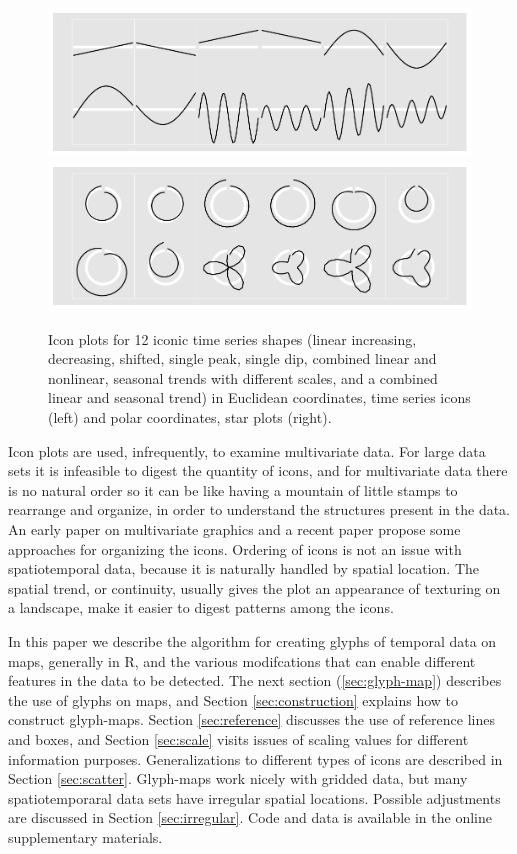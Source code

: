 \documentclass[oneside]{article}
\begin{document}
\begin{figure}[htbp]
  \centering
  \includegraphics[width=0.5\linewidth]{euclid-to-polar-1}%
  \includegraphics[width=0.5\linewidth]{euclid-to-polar-2}

  \caption{Icon plots for 12 iconic time series shapes (linear increasing, decreasing, shifted, single peak, single dip, combined linear and nonlinear, seasonal trends with different scales, and a combined linear and seasonal trend) in Euclidean coordinates, time series icons (left) and polar coordinates, star plots (right).}
  \label{fig:templates}
\end{figure}



Icon plots are used, infrequently, to examine multivariate data. For large data sets it is infeasible to digest the quantity of icons, and for multivariate data there is no natural order so it can be like having a mountain of little stamps to rearrange and organize, in order to understand the structures present in the data. An early paper on multivariate graphics \citep{kleiner:1981} and a recent paper \citep{hurley:2010} propose some approaches for organizing the icons. Ordering of icons is not an issue with spatiotemporal data, because it is naturally handled by spatial location. The spatial trend, or continuity, usually gives the plot an appearance of texturing on a landscape, make it easier to digest patterns among the icons.

In this paper we describe the algorithm for creating glyphs of temporal data on maps, generally in R, and the various modifcations that can enable different features in the data to be detected. The next section (\ref{sec:glyph-map}) describes the use of glyphs on maps, and Section \ref{sec:construction} explains how to construct glyph-maps. Section \ref{sec:reference} discusses the use of reference lines and boxes, and Section \ref{sec:scale} visits issues of scaling values for different information purposes. Generalizations to different types of icons are described in Section \ref{sec:scatter}. Glyph-maps work nicely with gridded data, but many spatiotemporaral data sets have irregular spatial locations. Possible adjustments are discussed in Section \ref{sec:irregular}. Code and data is available in the online supplementary materials.
\end{document}
